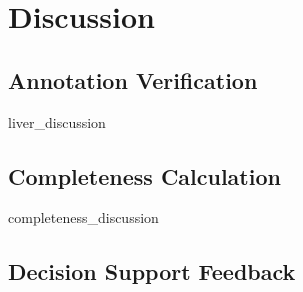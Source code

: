 \chapter{Discussion}

\section{Annotation Verification}
{liver_discussion}

\clearpage
\section{Completeness Calculation}
{completeness_discussion}

\clearpage
\section{Decision Support Feedback}